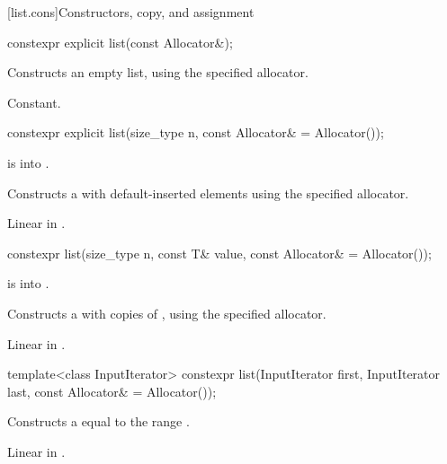 [list.cons]{Constructors, copy, and assignment}

%
\begin{itemdecl}
constexpr explicit list(const Allocator&);
\end{itemdecl}

\begin{itemdescr}
\pnum
\effects
Constructs an empty list, using the specified allocator.

\pnum
\complexity
Constant.
\end{itemdescr}

%
\begin{itemdecl}
constexpr explicit list(size_type n, const Allocator& = Allocator());
\end{itemdecl}

\begin{itemdescr}
\pnum
\expects
{} is  into .

\pnum
\effects
Constructs a  with
 default-inserted elements using the specified allocator.

\pnum
\complexity
Linear in
.
\end{itemdescr}

%
\begin{itemdecl}
constexpr list(size_type n, const T& value, const Allocator& = Allocator());
\end{itemdecl}

\begin{itemdescr}
\pnum
\expects
{} is  into .

\pnum
\effects
Constructs a
with
copies of
,
using the specified allocator.

\pnum
\complexity
Linear in
.
\end{itemdescr}

%
\begin{itemdecl}
template<class InputIterator>
  constexpr list(InputIterator first, InputIterator last, const Allocator& = Allocator());
\end{itemdecl}

\begin{itemdescr}
\pnum
\effects
Constructs a
equal to the range
.

\pnum
\complexity
Linear in
.
\end{itemdescr}

